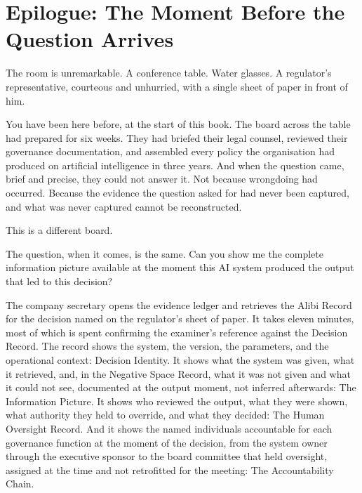 
\chapter*{Epilogue: The Moment Before the Question Arrives}

The room is unremarkable. A conference table. Water glasses. A regulator's representative, courteous and unhurried, with a single sheet of paper in front of him.

You have been here before, at the start of this book. The board across the table had prepared for six weeks. They had briefed their legal counsel, reviewed their governance documentation, and assembled every policy the organisation had produced on artificial intelligence in three years. And when the question came, brief and precise, they could not answer it. Not because wrongdoing had occurred. Because the evidence the question asked for had never been captured, and what was never captured cannot be reconstructed.

This is a different board.

The question, when it comes, is the same. Can you show me the complete information picture available at the moment this AI system produced the output that led to this decision?

The company secretary opens the evidence ledger and retrieves the Alibi Record for the decision named on the regulator's sheet of paper. It takes eleven minutes, most of which is spent confirming the examiner's reference against the Decision Record. The record shows the system, the version, the parameters, and the operational context: Decision Identity. It shows what the system was given, what it retrieved, and, in the Negative Space Record, what it was not given and what it could not see, documented at the output moment, not inferred afterwards: The Information Picture. It shows who reviewed the output, what they were shown, what authority they held to override, and what they decided: The Human Oversight Record. And it shows the named individuals accountable for each governance function at the moment of the decision, from the system owner through the executive sponsor to the board committee that held oversight, assigned at the time and not retrofitted for the meeting: The Accountability Chain.

